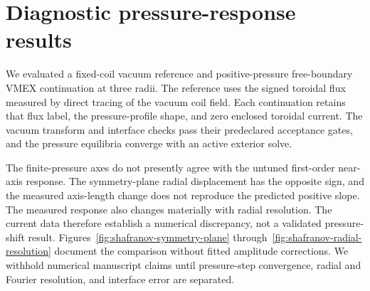 \section{Diagnostic pressure-response results}

We evaluated a fixed-coil vacuum reference and positive-pressure free-boundary
VMEX continuation at three radii. The reference uses the signed toroidal flux
measured by direct tracing of the vacuum coil field. Each continuation retains
that flux label, the pressure-profile shape, and zero enclosed toroidal current.
The vacuum transform and interface checks pass their predeclared acceptance
gates, and the pressure equilibria converge with an active exterior solve.

The finite-pressure axes do not presently agree with the untuned first-order
near-axis response. The symmetry-plane radial displacement has the opposite
sign, and the measured axis-length change does not reproduce the predicted
positive slope. The measured response also changes materially with radial
resolution. The current data therefore establish a numerical discrepancy, not
a validated pressure-shift result. Figures~\ref{fig:shafranov-symmetry-plane}
through~\ref{fig:shafranov-radial-resolution} document the comparison without
fitted amplitude corrections. We withhold numerical manuscript claims until
pressure-step convergence, radial and Fourier resolution, and interface error
are separated.
